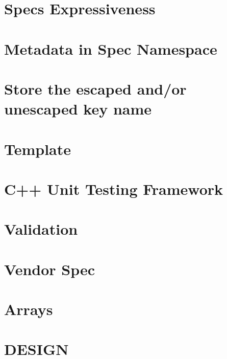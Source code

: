 \let\mypdfximage\pdfximage\def\pdfximage{\immediate\mypdfximage}\documentclass[twoside]{book}
\newcommand{\+}{\discretionary{\mbox{\scriptsize$\hookleftarrow$}}{}{}}
\begin{document}
\chapter{Spec\textquotesingle{}s Expressiveness}
\label{doc_decisions_spec_expressiveness_md}

\chapter{Metadata in Spec Namespace}
\label{doc_decisions_spec_metadata_md}

\chapter{Store the escaped and/or unescaped key name}
\label{doc_decisions_store_name_md}

\chapter{Template}
\label{doc_decisions_template_md}

\chapter{C++ Unit Testing Framework}
\label{doc_decisions_unit_testing_md}

\chapter{Validation}
\label{doc_decisions_validation_md}

\chapter{Vendor Spec}
\label{doc_decisions_vendor_spec_md}

\chapter{Arrays}
\label{doc_decisions_warning_array_md}

\chapter{DESIGN}
\label{doc_DESIGN_md}

\end{document}

